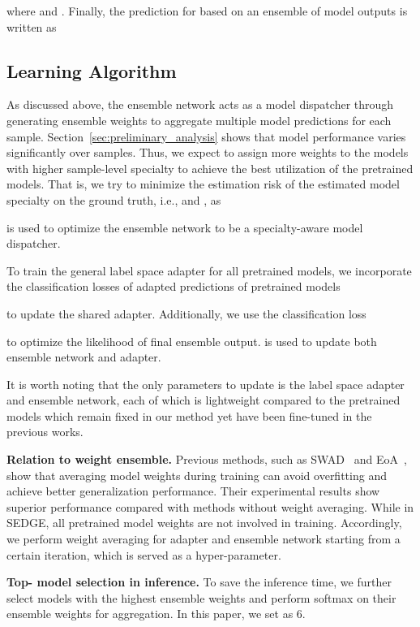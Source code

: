 \documentclass{article}
\newcommand{\method}{\textsc{SEDGE}\xspace}
\begin{document}
where  and .
Finally, the prediction for  based on an ensemble of  model outputs is written as


\subsection{Learning Algorithm}\label{sec:learning}

As discussed above, the ensemble network acts as a model dispatcher through generating ensemble weights to aggregate multiple model predictions for each sample.
Section~\ref{sec:preliminary_analysis} shows that model performance varies significantly over samples.
Thus, we expect to assign more weights to the models with higher sample-level specialty to achieve the best utilization of the pretrained models.
That is, we try to minimize the estimation risk of the estimated model specialty on the ground truth,
i.e.,  and , as

 is used to optimize the ensemble network to be a specialty-aware model dispatcher.

To train the general
label space adapter  for all pretrained models, we incorporate the classification losses of adapted predictions of pretrained models

to update the shared adapter.
Additionally, we use the classification loss

to optimize the likelihood of final ensemble output.
 is used to update both ensemble network and adapter.

It is worth noting that the only parameters to update
is the label space adapter and ensemble network, each of which is lightweight compared to the pretrained models which remain fixed in our method yet have been fine-tuned in the previous works.


\textbf{Relation to weight ensemble.}
Previous methods, such as SWAD~\citep{cha2021swad} and EoA~\citep{arpit2021ensemble}, show that averaging model weights during training can avoid overfitting and achieve better generalization performance. 
Their experimental results show superior performance compared with methods without weight averaging. 
While in \method, all pretrained model weights are not involved in training. 
Accordingly, we perform weight averaging for adapter and ensemble network starting from a certain iteration, which is served as a hyper-parameter.

\textbf{Top- model selection in inference.}
To save the inference time, we further select models with the highest  ensemble weights and perform softmax on their ensemble weights for aggregation. 
In this paper, we set  as 6. 
\end{document}
